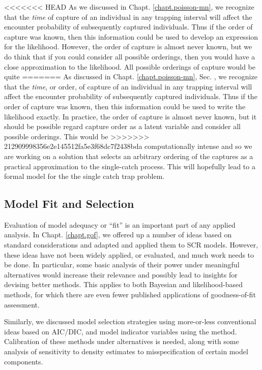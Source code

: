 <<<<<<< HEAD
As we discussed in Chapt. \ref{chapt.poisson-mn},
we recognize that the {\it time} of capture of an
individual in any trapping interval will affect the encounter
probability of subsequently captured individuals. Thus if
the order of capture was known, then this information could be
used to develop an expression for the likelihood. However, the order of capture
is almost never known, but we do think that if you could consider all
possible orderings, then you would have a close approximation to the
likelihood. All possible orderings of capture would be quite
=======
As discussed in Chapt. \ref{chapt.poisson-mn},
Sec. \label{poisson-mn.sec.singlecatch},
we recognize that the {\it time}, or order, of capture of an
individual in any trapping interval will affect the encounter
probability of subsequently captured individuals. Thus if
the order of capture was known, then this information could be
used to write the likelihood exactly. In practice, the order of capture
is almost never known, but %
it should be possible regard capture order as a latent variable and consider all
possible orderings.
This would be %
>>>>>>> 212909998356e2e145512fa5e3f68dc7f2438bda
computationally intense and so we are working on a solution that selects
an arbitrary ordering of the captures as a practical approximation to the
single-catch process. This will hopefully lead to a formal model
for the the single catch trap problem.

\subsection{Model Fit and Selection}

Evaluation of model adequacy or ``fit'' is an important part of any
applied analysis. In Chapt. \ref{chapt.gof}, we offered up a number of
ideas based on standard considerations and adapted and applied them
to SCR models. However, these ideas have not been widely applied, or
evaluated, and much work needs to be done. In particular, some basic
analysis of their power under meaningful alternatives would increase
their relevance and possibly lead to insights for devising better
methods. This applies to both Bayesian and likelihood-based methods,
for which there are even fewer published applications of
goodness-of-fit assessment.

Similarly, we discussed model selection strategies using more-or-less
conventional ideas based on AIC/DIC, and model indicator variables
using the \citet{kuo_mallick:1998} method. Calibration of these
methods under alternatives is needed, along with some analysis of
sensitivity to density estimates to misspecification of certain model
components.


